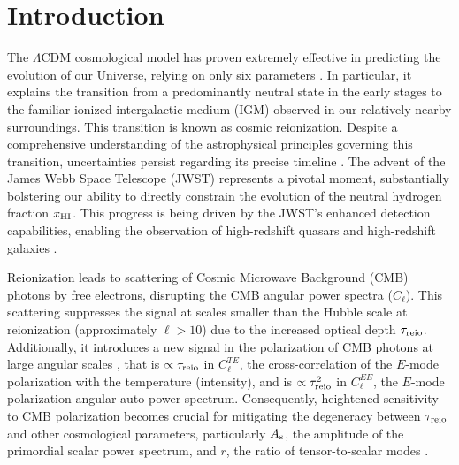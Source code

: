 \section*{Introduction}


The $\Lambda$CDM cosmological model has proven extremely effective in
predicting the evolution of our Universe, relying on only six parameters
\cite{Planck2020a}.
In particular, it explains the transition from a predominantly neutral
state in the early stages to the familiar ionized intergalactic medium
(IGM) observed in our relatively nearby surroundings.
This transition is known as cosmic reionization.
Despite a comprehensive understanding of the astrophysical principles
governing this transition, uncertainties persist regarding its precise
timeline \cite{Jin2023}.
The advent of the James Webb Space Telescope (JWST) \cite{Gardner2006}
represents a pivotal moment, substantially bolstering our ability to
directly constrain the evolution of the neutral hydrogen fraction
$x_{\mathrm{HI}}$.
This progress is being driven by the JWST's enhanced detection
capabilities, enabling the observation of high-redshift quasars
\cite{Eilers2023} and high-redshift galaxies
\cite{Adams2023, Bradley2023, Donnan2023}.

Reionization leads to scattering of Cosmic Microwave Background (CMB)
photons by free electrons, disrupting the CMB angular power spectra
($C_\ell$).
This scattering suppresses the signal at scales smaller than the Hubble
scale at reionization (approximately $\ell>10$) \cite{Planck2020b} due
to the increased optical depth $\tau_{\mathrm{reio}}$.
Additionally, it introduces a new signal in the polarization of CMB
photons at large angular scales \cite{Planck2020a}, that is $\propto
\tau_{\mathrm{reio}}$ in $C^{TE}_\ell$, the cross-correlation of the $E$-mode
polarization with the temperature (intensity), and is $\propto
\tau_{\mathrm{reio}}^2$ in $C^{EE}_\ell$, the $E$-mode polarization angular auto
power spectrum.
Consequently, heightened sensitivity to CMB polarization becomes crucial
for mitigating the degeneracy between $\tau_{\mathrm{reio}}$ and other
cosmological parameters, particularly $A_\mathrm{s}$, the amplitude of the
primordial scalar power spectrum, and $r$, the ratio of tensor-to-scalar
modes \cite{Natale2020}.

